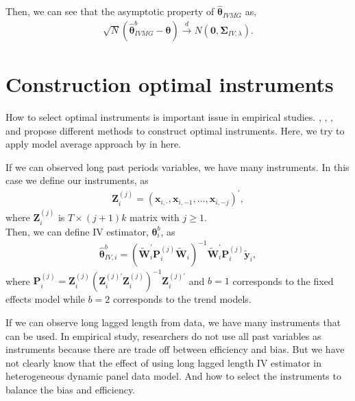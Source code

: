 \documentclass[12pt,a4paper,hyperref]{article}
\begin{document}
Then, we can see that the asymptotic property of $\hat{\boldsymbol{\theta}}_{IVMG} $ as,
\begin{align}
\sqrt{N}\left(\hat{\boldsymbol{\theta}}^{b}_{IVMG}-\boldsymbol{\theta}  \right)\overset{d}{\to} N\left(\boldsymbol{0},\boldsymbol{\Sigma}_{IV,\lambda} \right).
\end{align}








\section{Construction optimal instruments}
How to select optimal instruments is important issue in empirical studies.
\citet{Stephen:2001}, \citet{Kuersteiner:2010}, \citet{Ryo:2011}, \citet{Kang:2019} and \citet{Seojeong:2019} propose different methods to construct optimal instruments.
Here, we try to apply model average approach by \citet{Kuersteiner:2010} in here.  


If we can observed long past periods variables, we have many instruments. In this case we define our instruments, as
\begin{align}
\boldsymbol{Z}^{(j)}_{i}=\left( \boldsymbol{x}_{i,\cdot}, \boldsymbol{x}_{i,-1},\ldots, \boldsymbol{x}_{i,-j} \right)^{'},
\end{align}
where $\boldsymbol{Z}^{(j)}_{i}$ is $T \times  (j+1)k$ matrix with $j \geq 1$. \\




Then, we can define IV estimator, $\boldsymbol{\theta}^{b}_{i}$, as
\begin{align}
\hat{\boldsymbol{\theta}}^{b}_{IV,i}= \left( \tilde{\boldsymbol{W}}^{'}_{i}\boldsymbol{P}^{(j)}_{i} \tilde{\boldsymbol{W}}_{i} \right)^{-1} \tilde{\boldsymbol{W}}^{'}_{i}\boldsymbol{P}^{(j)}_{i} \tilde{\boldsymbol{y}}_{i},
\end{align}
where $\boldsymbol{P}^{(j)}_{i}=\boldsymbol{Z}^{(j)}_{i} \left(\boldsymbol{Z}^{(j)'}_{i}\boldsymbol{Z}^{(j)}_{i} \right)^{-1}\boldsymbol{Z}^{(j)'}_{i}$ and $b=1$ corresponds to the fixed effects model while $b=2$ corresponds to the trend models. 

If we can observe long lagged length from data, we have many instruments that can be used.
In empirical study, researchers do not use all past variables as instruments because there are trade off between efficiency and bias.
But we have not clearly know that the effect of using long lagged length  IV estimator in heterogeneous dynamic panel data model. And how to select the instruments to balance the bias and efficiency.
\end{document}
